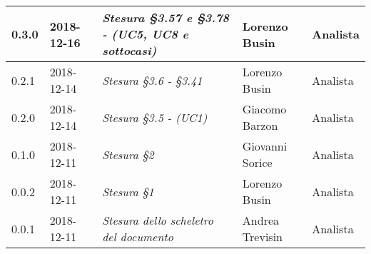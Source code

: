 \begin{longtable}{C{2cm}|C{2.5cm}|C{4.5cm}|C{2.5cm}|C{3cm}}
		0.3.0 & 2018-12-16 & \emph{Stesura §3.57 e §3.78 - (UC5, UC8 e sottocasi)} & Lorenzo Busin & Analista \\
		\hline
		
		0.2.1 & 2018-12-14 & \emph{Stesura §3.6 - §3.41} & Lorenzo Busin & Analista \\
		\hline
		
		0.2.0 & 2018-12-14 & \emph{Stesura §3.5 - (UC1)} & Giacomo Barzon & Analista \\
		\hline
		
		0.1.0 & 2018-12-11 & \emph{Stesura §2} & Giovanni Sorice & Analista \\
		\hline
		
		0.0.2 & 2018-12-11 & \emph{Stesura §1} & Lorenzo Busin & Analista \\
		\hline
		
		0.0.1 & 2018-12-11 & \emph{Stesura dello scheletro del documento} & Andrea Trevisin & Analista \\
		
	\end{longtable}



\clearpage